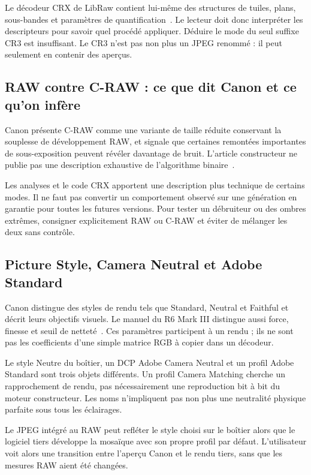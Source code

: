 Le décodeur CRX de LibRaw contient lui-même des structures
de tuiles, plans, sous-bandes et paramètres de quantification~\cite{librawcrx}.
Le lecteur doit donc interpréter les descripteurs pour
savoir quel procédé appliquer. Déduire le mode du seul
suffixe CR3 est insuffisant. Le CR3 n'est pas non plus un
JPEG renommé : il peut seulement en contenir des aperçus.

\subsection{RAW contre C-RAW : ce que dit Canon et ce qu'on infère}
Canon présente C-RAW comme une variante de taille réduite
conservant la souplesse de développement RAW, et signale
que certaines remontées importantes de sous-exposition
peuvent révéler davantage de bruit. L'article constructeur
ne publie pas une description exhaustive de l'algorithme
binaire~\cite{canonraw}.

Les analyses et le code CRX apportent une description
plus technique de certains modes. Il ne faut pas convertir
un comportement observé sur une génération en garantie
pour toutes les futures versions. Pour tester un débruiteur
ou des ombres extrêmes, consigner explicitement RAW ou
C-RAW et éviter de mélanger les deux sans contrôle.

\subsection{Picture Style, Camera Neutral et Adobe Standard}
Canon distingue des styles de rendu tels que Standard,
Neutral et Faithful et décrit leurs objectifs visuels.
Le manuel du R6 Mark III distingue aussi force, finesse
et seuil de netteté~\cite{canonstyle}. Ces paramètres
participent à un rendu ; ils ne sont pas les coefficients
d'une simple matrice RGB à copier dans un décodeur.

Le style Neutre du boîtier, un DCP Adobe Camera Neutral
et un profil Adobe Standard sont trois objets différents.
Un profil Camera Matching cherche un rapprochement de
rendu, pas nécessairement une reproduction bit à bit du
moteur constructeur. Les noms n'impliquent pas non plus
une neutralité physique parfaite sous tous les éclairages.

Le JPEG intégré au RAW peut refléter le style choisi sur
le boîtier alors que le logiciel tiers développe la
mosaïque avec son propre profil par défaut. L'utilisateur
voit alors une transition entre l'aperçu Canon et le
rendu tiers, sans que les mesures RAW aient été changées.

